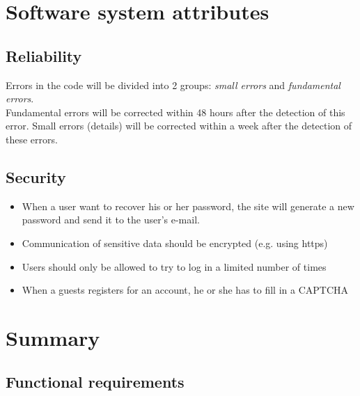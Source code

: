 \section{Software system attributes}
	\subsection{Reliability}
		Errors in the code will be divided into 2 groups: \textit{small errors} and \textit{fundamental errors}. \\ 
		Fundamental errors will be corrected within 48 hours after the detection of this error. Small errors (details) will be corrected within a week after the detection of these errors. 
	\subsection{Security}
		\begin{itemize}
			\item When a user want to recover his or her password, the site will generate a new password and send it to the user's e-mail.
			\item Communication of sensitive data should be encrypted (e.g. using https)
			\item Users should only be allowed to try to log in a limited number of times
			\item When a guests registers for an account, he or she has to fill in a CAPTCHA
		\end{itemize}
\section{Summary}

	\subsection{Functional requirements}
	

